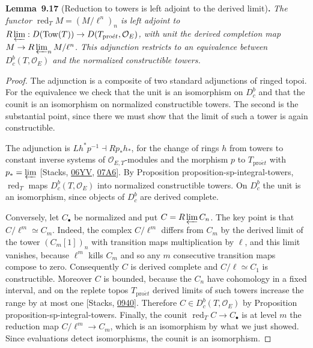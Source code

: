 \documentclass[11pt]{article}
\newenvironment{bpstatement}[2]{\par\addvspace{0.6\baselineskip}\noindent\textbf{#1}#2\textbf{.}\enspace\ignorespaces}
  {\par\addvspace{0.4\baselineskip}}
\newenvironment{bpstatementit}[2]{\begin{bpstatement}{#1}{#2}\itshape\ignorespaces}{\end{bpstatement}}
\providecommand{\Dbc}{}\renewcommand{\Dbc}{D^b_c}
\begin{document}
\label{bp57}%
\begin{bpstatementit}{Lemma~9.17}{ (Reduction to towers is left adjoint to the derived limit)}
The functor \(\operatorname{red}_TM=(M/\ell^n)_n\) is left adjoint to \(R\varprojlim:D(\operatorname{Tow}(T))\to D(T_{\mathrm{pro}\acute{e}t},\mathcal O_E)\), with unit the derived completion map \(M\to R\varprojlim_nM/\ell^n\). This adjunction restricts to an equivalence between \(\Dbc(T,\mathcal O_E)\) and the normalized constructible towers.
\end{bpstatementit}

\begin{proof}[{Proof}]\label{bp58}%
The adjunction is a composite of two standard adjunctions of ringed topoi. For the equivalence we check that the unit is an isomorphism on \(\Dbc\) and that the counit is an isomorphism on normalized constructible towers. The second is the substantial point, since there we must show that the limit of such a tower is again constructible.

The adjunction is \(Lh^*p^{-1}\dashv Rp_*h_*\), for the change of rings \(h\) from towers to constant inverse systems of \(\mathcal O_{E,T}\)-modules and the morphism \(p\) to \(T_{\mathrm{pro}\acute{e}t}\) with \(p_*=\varprojlim\) [Stacks, \href{https://stacks.math.columbia.edu/tag/06YV}{06YV}, \href{https://stacks.math.columbia.edu/tag/07A6}{07A6}]. By Proposition proposition-sp-integral-towers, \(\operatorname{red}_T\) maps \(\Dbc(T,\mathcal O_E)\) into normalized constructible towers. On \(\Dbc\) the unit is an isomorphism, since objects of \(\Dbc\) are derived complete.

Conversely, let \(C_\bullet\) be normalized and put \(C=R\varprojlim C_n\). The key point is that \(C/\ell^m\simeq C_m\). Indeed, the complex \(C/\ell^m\) differs from \(C_m\) by the derived limit of the tower \((C_m[1])_n\) with transition maps multiplication by \(\ell\), and this limit vanishes, because \(\ell^m\) kills \(C_m\) and so any \(m\) consecutive transition maps compose to zero. Consequently \(C\) is derived complete and \(C/\ell\simeq C_1\) is constructible. Moreover \(C\) is bounded, because the \(C_n\) have cohomology in a fixed interval, and on the replete topos \(T_{\mathrm{pro}\acute{e}t}\) derived limits of such towers increase the range by at most one [Stacks, \href{https://stacks.math.columbia.edu/tag/0940}{0940}]. Therefore \(C\in\Dbc(T,\mathcal O_E)\) by Proposition proposition-sp-integral-towers. Finally, the counit \(\operatorname{red}_TC\to C_\bullet\) is at level \(m\) the reduction map \(C/\ell^m\to C_m\), which is an isomorphism by what we just showed. Since evaluations detect isomorphisms, the counit is an isomorphism.
\end{proof}
\end{document}
